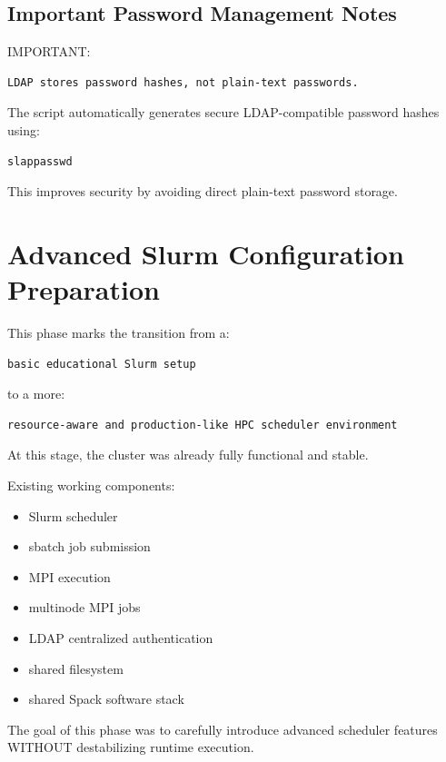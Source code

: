 \documentclass[11pt]{article}
\begin{document}
\subsection{Important Password Management Notes}
\label{sec:orgc61b724}

IMPORTANT:

\begin{verbatim}
LDAP stores password hashes, not plain-text passwords.
\end{verbatim}

The script automatically generates secure LDAP-compatible password hashes using:

\begin{verbatim}
slappasswd
\end{verbatim}

This improves security by avoiding direct plain-text password storage.
\section{Advanced Slurm Configuration Preparation}
\label{sec:org50b76a7}

This phase marks the transition from a:

\begin{verbatim}
basic educational Slurm setup
\end{verbatim}

to a more:

\begin{verbatim}
resource-aware and production-like HPC scheduler environment
\end{verbatim}

At this stage, the cluster was already fully functional and stable.

Existing working components:

\begin{itemize}
\item Slurm scheduler
\item sbatch job submission
\item MPI execution
\item multinode MPI jobs
\item LDAP centralized authentication
\item shared filesystem
\item shared Spack software stack
\end{itemize}

The goal of this phase was to carefully introduce advanced scheduler
features WITHOUT destabilizing runtime execution.
\end{document}

